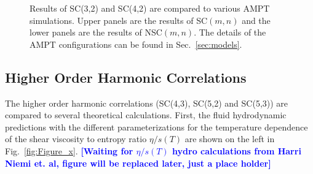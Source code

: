 \documentclass[ALICE,manyauthors]{cernphprep}
\begin{document}
\begin{figure}[p]
\begin{center}
        \caption{Results of  SC(3,2) and SC(4,2) are compared to various AMPT simulations. Upper panels are the results of SC$(m,n)$ and the lower panels are the results of NSC$(m,n)$. The details of the AMPT configurations can be found in Sec.~\ref{sec:models}.}
        \label{fig:Figure_5}
        \end{center}   
 \end{figure}
 
 \newpage
\subsection{Higher Order Harmonic Correlations}
The higher order harmonic correlations (SC(4,3), SC(5,2) and SC(5,3)) are compared to several theoretical calculations. 
First, the fluid hydrodynamic predictions with the different parameterizations for the temperature dependence of the shear viscosity to entropy ratio $\eta/s(T)$ are shown on the left in Fig.~\ref{fig:Figure_x}. 
\noindent\textbf{\textcolor{blue}{[Waiting for $\eta/s(T)$ hydro calculations from Harri Niemi et. al, figure will be replaced later, just a place holder]}}
\end{document}
